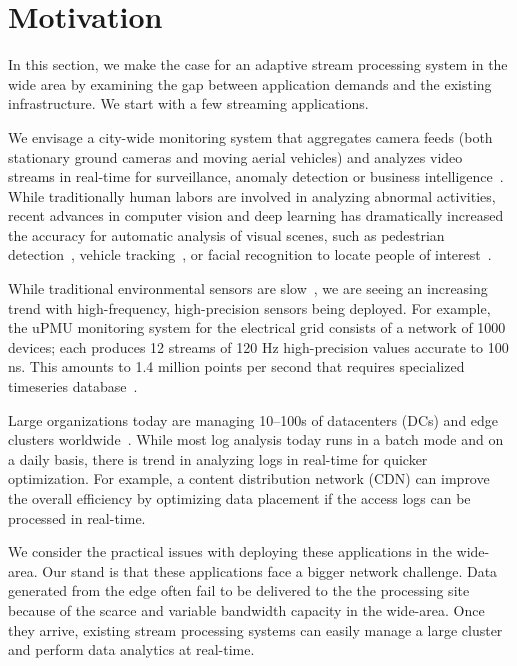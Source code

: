 \section{Motivation}
\label{sec:background-motivation}

In this section, we make the case for an adaptive stream processing system in
the wide area by examining the gap between application demands and the existing
infrastructure. We start with a few streaming applications.

 We envisage a city-wide monitoring system that
aggregates camera feeds (both stationary ground cameras and moving aerial
vehicles) and analyzes video streams in real-time for surveillance, anomaly
detection or business intelligence~\cite{oh2011large}. While traditionally human
labors are involved in analyzing abnormal activities, recent advances in
computer vision and deep learning has dramatically increased the accuracy for
automatic analysis of visual scenes, such as pedestrian
detection~\cite{dollar2012pedestrian}, vehicle tracking~\cite{coifman1998real},
or facial recognition to locate people of interest~\cite{parkhi2015deep,
  Lu:2015:SHF:2888116.2888245}.

 While traditional environmental sensors are
slow~\cite{atzori2010internet}, we are seeing an increasing trend with
high-frequency, high-precision sensors being deployed. For example, the uPMU
monitoring system for the electrical grid consists of a network of 1000 devices;
each produces 12 streams of 120 Hz high-precision values accurate to 100
ns. This amounts to 1.4 million points per second that requires specialized
timeseries database~\cite{andersen2016btrdb}.

 Large organizations today are managing 10--100s of
datacenters (DCs) and edge clusters worldwide~\cite{calder2013mapping}. While
most log analysis today runs in a batch mode and on a daily basis, there is
trend in analyzing logs in real-time for quicker optimization. For example, a
content distribution network (CDN) can improve the overall efficiency by
optimizing data placement if the access logs can be processed in real-time.

\vspace{0.5em}

We consider the practical issues with deploying these applications in the
wide-area. Our stand is that these applications face a bigger network challenge.
Data generated from the edge often fail to be delivered to the the processing
site because of the scarce and variable bandwidth capacity in the
wide-area. Once they arrive, existing stream processing systems can easily
manage a large cluster and perform data analytics at real-time.


